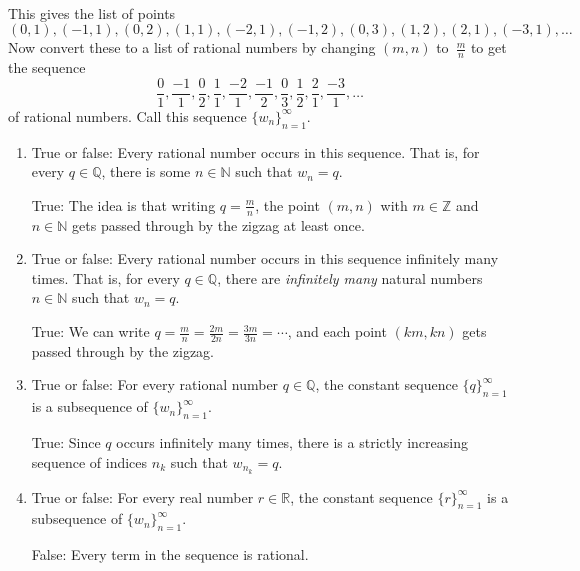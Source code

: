 \documentclass[12pt]{amsart}
\newcommand{\Q}{\mathbb{Q}}
\newcommand{\R}{{\mathbb{R}}}
\newcommand{\Z}{\mathbb{Z}}
\newcommand{\N}{\mathbb{N}}
\numberwithin{equation}{section}
\theoremstyle{plain} %
\theoremstyle{definition}
\theoremstyle{remark}
\begin{document}
\begin{framed}
\

\

\
	
\noindent	This gives the list of points
	$$
	(0,1),  (-1,1), (0,2), (1,1), (-2,1), (-1,2), (0,3), (1,2), (2,1), (-3,1), \dots
	$$
	Now convert these to a list of rational numbers by changing $(m,n)$ to~$\frac{m}{n}$ to get the sequence
	$$
	\frac01, \frac{-1}1, \frac02, \frac11, \frac{-2}1, \frac{-1}2, \frac03, \frac12, \frac21, \frac{-3}1, \dots
	$$
	of rational numbers.  Call this
	sequence $\{ w_n\}_{n=1}^\infty$.
\end{framed}

\begin{enumerate}

\item True or false: Every rational number occurs in this sequence. That is, for every $q\in \Q$, there is some $n\in \N$ such that $w_n=q$.

\begin{framed}
True: The idea is that writing $q=\frac{m}{n}$, the point $(m,n)$ with $m\in \Z$ and $n\in \N$ gets passed through by the zigzag at least once. 
\end{framed}

\item True or false:  Every rational number occurs in this sequence infinitely many times. That is, for every $q\in \Q$, there are \emph{infinitely many} natural numbers $n\in \N$ such that $w_n=q$.

\begin{framed}
True: We can write $q=\frac{m}{n} = \frac{2m}{2n} = \frac{3m}{3n} = \cdots$, and each point $(km,kn)$ gets passed through by the zigzag.
\end{framed}

\item True or false: For every rational number $q\in \Q$, the constant sequence $\{q\}_{n=1}^{\infty}$ is a subsequence of $\{w_n\}_{n=1}^\infty$.

\begin{framed}
True: Since $q$ occurs infinitely many times, there is a strictly increasing sequence of indices $n_k$ such that $w_{n_k} = q$.
\end{framed}

\item True or false: For every real number $r\in \R$, the constant sequence $\{r\}_{n=1}^{\infty}$ is a subsequence of $\{w_n\}_{n=1}^\infty$.

\begin{framed}
False: Every term in the sequence is rational.
\end{framed}


\end{enumerate}
\end{document}
